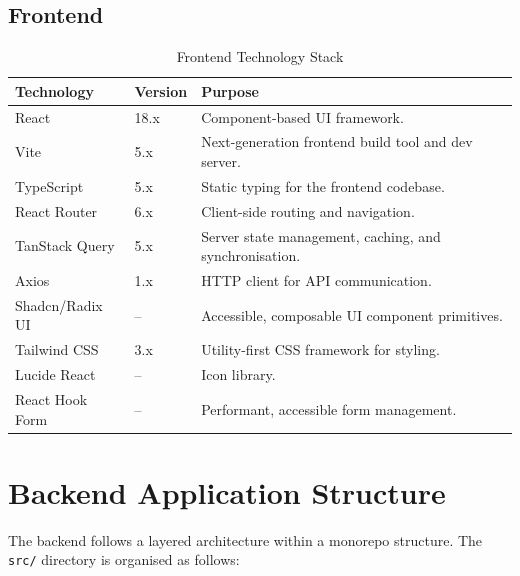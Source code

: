 \subsection{Frontend}

\begin{table}[H]
\centering
\caption{Frontend Technology Stack}
\begin{tabularx}{\textwidth}{llX}
\toprule
\textbf{Technology} & \textbf{Version} & \textbf{Purpose} \\
\midrule
React       & 18.x & Component-based UI framework. \\
Vite        & 5.x  & Next-generation frontend build tool and dev server. \\
TypeScript  & 5.x  & Static typing for the frontend codebase. \\
React Router & 6.x & Client-side routing and navigation. \\
TanStack Query & 5.x & Server state management, caching, and synchronisation. \\
Axios       & 1.x  & HTTP client for API communication. \\
Shadcn/Radix UI & -- & Accessible, composable UI component primitives. \\
Tailwind CSS & 3.x & Utility-first CSS framework for styling. \\
Lucide React & -- & Icon library. \\
React Hook Form & -- & Performant, accessible form management. \\
\bottomrule
\end{tabularx}
\label{tab:frontend_stack}
\end{table}

\section{Backend Application Structure}

The backend follows a layered architecture within a monorepo structure. The \texttt{src/} directory is organised as follows:

